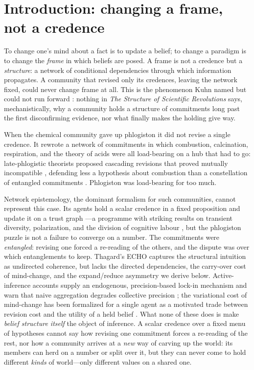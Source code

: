 \documentclass[11pt]{article}
\begin{document}
\section{Introduction: changing a frame, not a credence}
\label{sec:background}

To change one's mind about a fact is to update a belief; to change a paradigm is to change the
\emph{frame} in which beliefs are posed. A frame is not a credence but a \emph{structure}: a
network of conditional dependencies through which information propagates. A community that revised
only its credences, leaving the network fixed, could never change frame at all. This is the
phenomenon Kuhn named but could not run forward \citep{kuhn1962}: nothing in \emph{The Structure of
Scientific Revolutions} says, mechanistically, why a community holds a structure of commitments
long past the first disconfirming evidence, nor what finally makes the holding give way.

When the chemical community gave up phlogiston it did not revise a single credence. It rewrote a
network of commitments in which combustion, calcination, respiration, and the theory of acids were
all load-bearing on a hub that had to go: late-phlogistic theorists proposed cascading revisions that
proved mutually incompatible \citep{blumenthal2017,holmes2000}, defending less a hypothesis about
combustion than a constellation of entangled commitments \citep{boantza2011}. Phlogiston was
load-bearing for too much.

Network epistemology, the dominant formalism for such communities, cannot represent this case. Its
agents hold a scalar credence in a fixed proposition and update it on a trust graph
\citep{zollman2010,oconnor2019,zollman2013}---a programme with striking results on transient
diversity, polarization, and the division of cognitive labour
\citep{jonard2025,michelini2023,kitcher1990,strevens2003}, but the phlogiston puzzle is not a failure
to converge on a number. The commitments were \emph{entangled}: revising one forced a re-reading of
the others, and the dispute was over which entanglements to keep. Thagard's ECHO
\citep{thagard1989,thagard1990} captures the structural intuition as undirected coherence, but lacks
the directed dependencies, the carry-over cost of mind-change, and the expand/reduce asymmetry we
derive below. Active-inference accounts supply an endogenous, precision-based lock-in mechanism
\citep{albarracin2022} and warn that naive aggregation degrades collective precision
\citep{friston2023federated,waade2025}; the variational cost of mind-change has been formalized for a
single agent as a motivated trade between revision cost and the utility of a held belief
\citep{hyland2025}. What none of these does is make \emph{belief structure itself} the object of
inference. A scalar credence over a fixed menu of hypotheses cannot say how revising one commitment
forces a re-reading of the rest, nor how a community arrives at a \emph{new} way of carving up the
world: its members can herd on a number or split over it, but they can never come to hold different
\emph{kinds} of world---only different values on a shared one.
\end{document}
